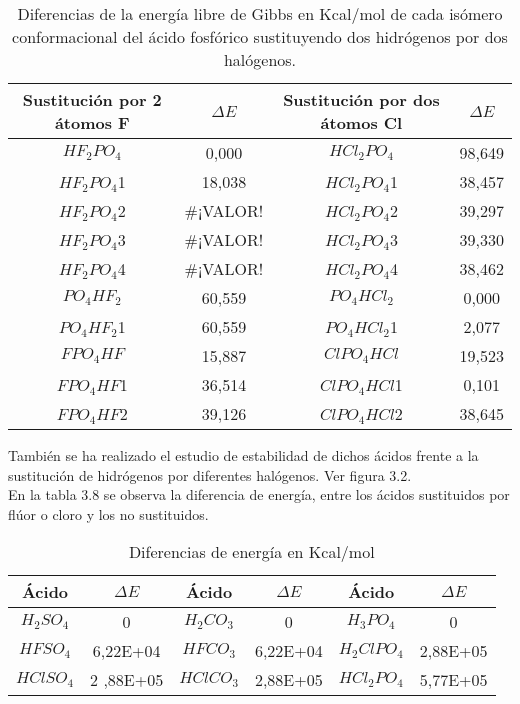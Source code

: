 \begin{table}[H]
	\centering
	\begin{tabular}{|c|c|c|c|}
		\hline
		Sustitución por 2 átomos F & $\Delta E$   & Sustitución por dos átomos Cl & $\Delta E$     \\ \hline
		$HF_2PO_4$  & 0,000     & $HCl_2PO_4$     & 98,649 \\ \hline
		$HF_2PO_4$1  & 18,038    & $HCl_2PO_4$1   & 38,457 \\ \hline
		$HF_2PO_4$2   & \#¡VALOR! & $HCl_2PO_4$2    & 39,297 \\ \hline
		$HF_2PO_4$3   & \#¡VALOR! & $HCl_2PO_4$3    & 39,330 \\ \hline
		$HF_2PO_4$4   & \#¡VALOR! & $HCl_2PO_4$4  & 38,462 \\ \hline
		$PO_4HF_2$    & 60,559    & $PO_4HCl_2$  & 0,000  \\ \hline
		$PO_4HF_2$1   & 60,559    & $PO_4HCl_2$1   & 2,077  \\ \hline
		$FPO_4HF$    & 15,887    & $ClPO_4HCl$  & 19,523 \\ \hline
		$FPO_4HF$1   & 36,514    & $ClPO_4HCl$1   & 0,101  \\ \hline
		$FPO_4HF$2  & 39,126    & $ClPO_4HCl$2   & 38,645 \\ \hline
	\end{tabular}
\caption{Diferencias de la energía libre de Gibbs en Kcal/mol de cada isómero conformacional del ácido fosfórico sustituyendo dos hidrógenos por dos halógenos.}
\end{table}

También se ha realizado el estudio de estabilidad de dichos ácidos frente a la sustitución de hidrógenos por diferentes halógenos. Ver figura 3.2. \\
En la tabla 3.8 se observa la diferencia de energía, entre los ácidos sustituidos por flúor o cloro y los no sustituidos.


\begin{table}[H]
	\centering
	\begin{tabular}{|c|c|c|c|c|c|}
		\hline
		Ácido	& $\Delta E$ &	Ácido	& $\Delta E$ & Ácido & $\Delta E$\\ \hline
		$ H_2SO_4$	& 0	& $H_2CO_3$	 & 0 &	$H_3PO_4$	& 0 \\ \hline
		$HFSO_4$ &	6,22E+04	& $HFCO_3$	& 6,22E+04	& $H_2ClPO_4$	& 2,88E+05 \\ \hline
		$HClSO_4$ &	2 ,88E+05	& $HClCO_3$ &	2,88E+05	& $HCl_2PO_4$ &	5,77E+05 \\ \hline
	\end{tabular}
	\caption{Diferencias de energía en Kcal/mol}
\end{table}

